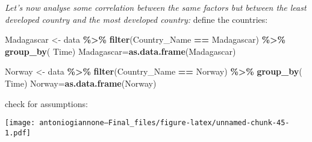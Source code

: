 \documentclass[
]{article}
\newenvironment{Shaded}{\begin{snugshade}}{\end{snugshade}}
\newcommand{\AttributeTok}[1]{\textcolor[rgb]{0.13,0.29,0.53}{#1}}
\newcommand{\CommentTok}[1]{\textcolor[rgb]{0.56,0.35,0.01}{\textit{#1}}}
\newcommand{\FunctionTok}[1]{\textcolor[rgb]{0.13,0.29,0.53}{\textbf{#1}}}
\newcommand{\NormalTok}[1]{#1}
\newcommand{\OtherTok}[1]{\textcolor[rgb]{0.56,0.35,0.01}{#1}}
\newcommand{\SpecialCharTok}[1]{\textcolor[rgb]{0.81,0.36,0.00}{\textbf{#1}}}
\newcommand{\StringTok}[1]{\textcolor[rgb]{0.31,0.60,0.02}{#1}}
\begin{document}
\emph{Let's now analyse some correlation between the same factors but
between the least developed country and the most developed country:}
define the countries:

\begin{Shaded}
\begin{Highlighting}[]
\NormalTok{Madagascar }\OtherTok{\textless{}{-}}\NormalTok{ data }\SpecialCharTok{\%\textgreater{}\%}
  \FunctionTok{filter}\NormalTok{(Country\_Name }\SpecialCharTok{==} \StringTok{\textquotesingle{}Madagascar\textquotesingle{}}\NormalTok{) }\SpecialCharTok{\%\textgreater{}\%}
  \FunctionTok{group\_by}\NormalTok{( Time)}
\NormalTok{Madagascar}\OtherTok{=}\FunctionTok{as.data.frame}\NormalTok{(Madagascar)}

\NormalTok{Norway }\OtherTok{\textless{}{-}}\NormalTok{ data }\SpecialCharTok{\%\textgreater{}\%}
  \FunctionTok{filter}\NormalTok{(Country\_Name }\SpecialCharTok{==} \StringTok{\textquotesingle{}Norway\textquotesingle{}}\NormalTok{) }\SpecialCharTok{\%\textgreater{}\%}
  \FunctionTok{group\_by}\NormalTok{( Time)}
\NormalTok{Norway}\OtherTok{=}\FunctionTok{as.data.frame}\NormalTok{(Norway)}
\end{Highlighting}
\end{Shaded}

check for assumptions:

\begin{Shaded}
\end{Shaded}

\texttt{[image: antoniogiannone---Final\_files/figure-latex/unnamed-chunk-45-1.pdf]}

\begin{Shaded}
\end{Shaded}
\end{document}
